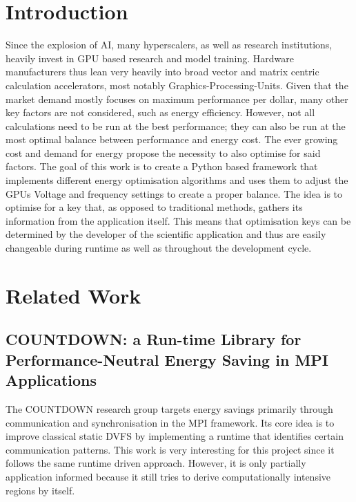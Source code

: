 \documentclass[12pt]{article}
\begin{document}
\section{Introduction}

Since the explosion of AI, many hyperscalers, as well as research institutions, heavily invest in GPU based research and model training. Hardware manufacturers thus lean very heavily into broad vector and matrix centric calculation accelerators, most notably Graphics-Processing-Units. Given that the market demand mostly focuses on maximum performance per dollar, many other key factors are not considered, such as energy efficiency. However, not all calculations need to be run at the best performance; they can also be run at the most optimal balance between performance and energy cost. The ever growing cost and demand for energy propose the necessity to also optimise for said factors. The goal of this work is to create a Python based framework that implements different energy optimisation algorithms and uses them to adjust the GPUs Voltage and frequency settings to create a proper balance. The idea is to optimise for a key that, as opposed to traditional methods, gathers its information from the application itself. This means that optimisation keys can be determined by the developer of the scientific application and thus are easily changeable during runtime as well as throughout the development cycle.
\section{Related Work}
\subsection{COUNTDOWN: a Run-time Library for Performance-Neutral Energy Saving in MPI Applications}
The COUNTDOWN research group targets energy savings primarily through communication and synchronisation in the MPI framework. Its core idea is to improve classical static DVFS by implementing a runtime that identifies certain communication patterns. This work is very interesting for this project since it follows the same runtime driven approach. However, it is only partially application informed because it still tries to derive computationally intensive regions by itself.
\end{document}
